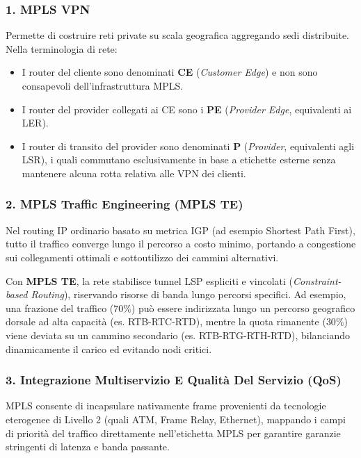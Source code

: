 \documentclass[11pt, a4paper]{article}
\begin{document}
\subsubsection{1. MPLS VPN}
Permette di costruire reti private su scala geografica aggregando sedi distribuite. Nella terminologia di rete:
\begin{itemize}[noitemsep]
    \item I router del cliente sono denominati \textbf{CE} (\emph{Customer Edge}) e non sono consapevoli dell'infrastruttura MPLS.
    \item I router del provider collegati ai CE sono i \textbf{PE} (\emph{Provider Edge}, equivalenti ai LER).
    \item I router di transito del provider sono denominati \textbf{P} (\emph{Provider}, equivalenti agli LSR), i quali commutano esclusivamente in base a etichette esterne senza mantenere alcuna rotta relativa alle VPN dei clienti.
\end{itemize}


\subsubsection{2. MPLS Traffic Engineering (MPLS TE)}
Nel routing IP ordinario basato su metrica IGP (ad esempio Shortest Path First), tutto il traffico converge lungo il percorso a costo minimo, portando a congestione sui collegamenti ottimali e sottoutilizzo dei cammini alternativi.

Con \textbf{MPLS TE}, la rete stabilisce tunnel LSP espliciti e vincolati (\emph{Constraint-based Routing}), riservando risorse di banda lungo percorsi specifici. Ad esempio, una frazione del traffico ($70\%$) può essere indirizzata lungo un percorso geografico dorsale ad alta capacità (es. RTB-RTC-RTD), mentre la quota rimanente ($30\%$) viene deviata su un cammino secondario (es. RTB-RTG-RTH-RTD), bilanciando dinamicamente il carico ed evitando nodi critici.


\subsubsection{3. Integrazione Multiservizio E Qualità Del Servizio (QoS)}
MPLS consente di incapsulare nativamente frame provenienti da tecnologie eterogenee di Livello 2 (quali ATM, Frame Relay, Ethernet), mappando i campi di priorità del traffico direttamente nell'etichetta MPLS per garantire garanzie stringenti di latenza e banda passante.
\end{document}
